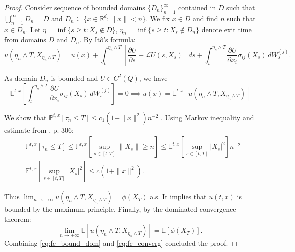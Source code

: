 \documentclass[11pt,a4paper] {article}
\begin{document}
\begin{proof}
Consider sequence of bounded domains $\{D_n\}_{n=1}^{\infty}$ contained in $D$ such that $\bigcup\limits_{n=1}^{\infty} D_n=D$ and $D_n\subseteq \{x\in \mathbb{R}^d: \|x\|< n\}$. We fix $x\in D$ and find $n$ such that $x\in D_n$. Let
$\eta=\inf\{s\ge t: X_s\not\in D\}$, $\eta_n=\inf\{s\ge t: X_s\not\in D_n\}$ denote exit time from domains $D$ and $D_n$. By It\^{o}'s formula:
\begin{equation*}
u(\eta_n\wedge T, X_{\eta_n\wedge T})=u(x)+\int_t^{\eta_n\wedge T}\left[\frac{\partial U}{\partial s}-\mathcal{L}U(s,X_s)\right]\, ds + \int_t^{\eta_n\wedge T}\frac{\partial U}{\partial x_i}\sigma_{ij}(X_s)\,dW_s^{(j)}.
\end{equation*}

As domain $D_n$ is bounded and $U\in C^2(Q)$, we have
\begin{equation}\label{eq:fc_bound_dom}
\mathbb{E}^{t,x}\left[ \int_t^{\eta_n\wedge T}\frac{\partial U}{\partial x_i}\sigma_{ij}(X_s)\,dW_s^{(j)}\right]=0
\implies 
u(x)=\mathbb{E}^{t,x}\left[u(\eta_n\wedge T, X_{\eta_n\wedge T})\right]
\end{equation}

We show that $\mathbb{P}^{t,x}\left[\tau_n\le T\right]\le c_1(1+\|x\|^2)n^{-2}$
. Using Markov inequality and estimate from \cite{KaratzShre}, p. 306:
\begin{equation*}
\begin{split}
&\mathbb{P}^{t,x}\left[\tau_n\le T\right]\le \mathbb{P}^{t,x}\left[\sup_{s\in [t,T]}\|X_s\|\ge n\right]\le 
\mathbb{E}^{t,x}\left[\sup_{s\in [t,T]}|X_s|^2\right]n^{-2}\\
&\mathbb{E}^{t,x}\left[\sup_{s\in [t,T]}|X_s|^2\right]\le c\left(1+\|x\|^2\right).
\end{split}
\end{equation*}

Thus $\lim_{n\to +\infty}u(\eta_n\wedge T, X_{\eta_n\wedge T}) = \phi(X_T)$ a.s. 
It implies that $u(t,x)$ is bounded by the maximum principle. Finally, by the dominated convergence theorem:\vspace*{-0.5\baselineskip}
\begin{equation}\label{eq:fc_converg}
\lim_{n\to +\infty}\mathbb{E}\left[u(\eta_n\wedge T, X_{\eta_n\wedge T})\right] = \mathbb{E}\left[\phi(X_T)\right].
\end{equation}
Combining \eqref{eq:fc_bound_dom} and \eqref{eq:fc_converg} concluded the proof.
\end{proof}
\end{document}

